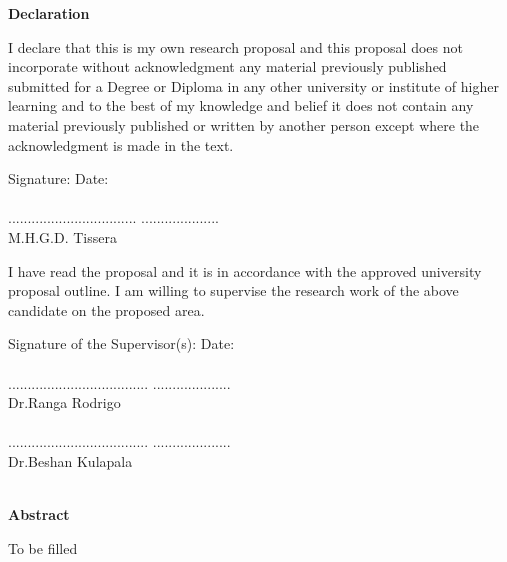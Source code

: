 \documentclass[a4paper,oneside,12pt]{report}
\begin{document}
\begin{flushleft}
\large
\textbf{Declaration}
\end{flushleft}
\setlength{\parindent}{0cm}

I declare that this is my own research proposal and this proposal does not incorporate without acknowledgment any material previously published submitted for a Degree or Diploma in any other university or institute of higher learning and to the best of my knowledge and belief it does not contain any material previously published or written by another person except where the acknowledgment is made in the text.

Signature:  \hspace{7cm}  Date:\\
\\
................................. \hspace{5cm} ....................\\
M.H.G.D. Tissera

I have read the proposal and it is in accordance with the approved university proposal outline. I am willing to supervise the research work of the above candidate on the proposed area.

Signature of the Supervisor(s):  \hspace{3.25cm}  Date:\\
\\
.................................... \hspace{4.25cm} ....................\\
Dr.Ranga Rodrigo\\
\\
.................................... \hspace{4.25cm} ....................\\
Dr.Beshan Kulapala\\
\\


\clearpage


\begin{flushleft}
	\large
	\textbf{Abstract}
\end{flushleft}
\small

To be filled 

\cite{R01} \cite{R02} \cite{R03} \cite{R04} \cite{R05} \cite{R06} \cite{R07} \cite{R08} \cite{R09} \cite{R10} \cite{R11} \cite{R12} \cite{R13} \cite{R14} \cite{R15} \cite{R16} \cite{R17} \cite{R18} \cite{R19} \cite{R20} \cite{R21} \cite{R22} \cite{R23} \cite{R24} \cite{R25} \cite{R26} \cite{R27} \cite{R28} \cite{R29} \cite{R30} \cite{R31} \cite{R32} \cite{R33} \cite{R34} \cite{R35} \cite{R36} \cite{R37} \cite{R38} \cite{R39} \cite{R40} \cite{R41} \cite{R42} \cite{R43} \cite{R44} \cite{R45} \cite{R46} \cite{R47} \cite{R48}
\cite{R49} \cite{R50} \cite{R51} \cite{R52} \cite{R53} \cite{R54} \cite{R55} \cite{R56} \cite{R57} \cite{R58} \cite{R59} \cite{R60}
\cite{R61} \cite{R62} \cite{R63} \cite{R64} \cite{R65} \cite{R66}
\end{document}
